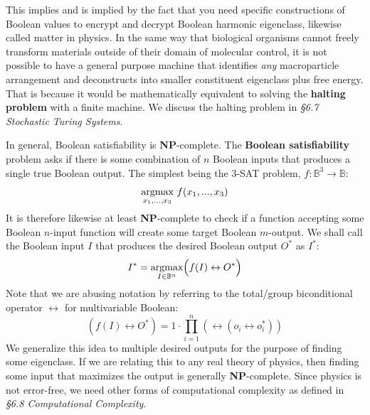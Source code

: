 \documentclass[10pt, a5paper, twoside, openright]{memoir}
\begin{document}
This implies and is implied by the fact that you need specific constructions of Boolean values to encrypt and decrypt Boolean harmonic eigenclass, likewise called matter in physics. In the same way that biological organisms cannot freely transform materials outside of their domain of molecular control, it is not possible to have a general purpose machine that identifies \textit{any} macroparticle arrangement and deconstructs into smaller constituent eigenclass plus free energy. That is because it would be mathematically equivalent to solving the \textbf{halting problem} with a finite machine. We discuss the halting problem in \textit{\S 6.7 Stochastic Turing Systems}.

In general, Boolean satisfiability is \textbf{NP}-complete. The \textbf{Boolean satisfiability} problem asks if there is some combination of $n$ Boolean inputs that produces a single true Boolean output. The simplest being the 3-SAT problem, $f: \mathbb B^3 \rightarrow \mathbb B$:
$$\underset{x_1,...,x_3}{\textnormal{argmax}} \ f(x_1,...,x_3)$$
It is therefore likewise at least \textbf{NP}-complete to check if a function accepting some Boolean $n$-input function will create some target Boolean $m$-output. We shall call the Boolean input $I$ that produces the desired Boolean output $O^*$ as $I^*$:
$$I^* = \underset{I \in \mathbb B^n}{\textnormal{argmax}} \Big( f(I) \leftrightarrow O^* \Big)$$
Note that we are abusing notation by referring to the total/group biconditional operator $\leftrightarrow$ for multivariable Boolean:
$$(f(I) \leftrightarrow O^*) = 1 \cdot \prod\limits_{i=1}^n (\leftrightarrow (o_i \leftrightarrow o_i^*))$$
We generalize this idea to multiple desired outputs for the purpose of finding some eigenclass. If we are relating this to any real theory of physics, then finding some input that maximizes the output is generally \textbf{NP}-complete. Since physics is not error-free, we need other forms of computational complexity as defined in \textit{\S 6.8 Computational Complexity}.
\end{document}
